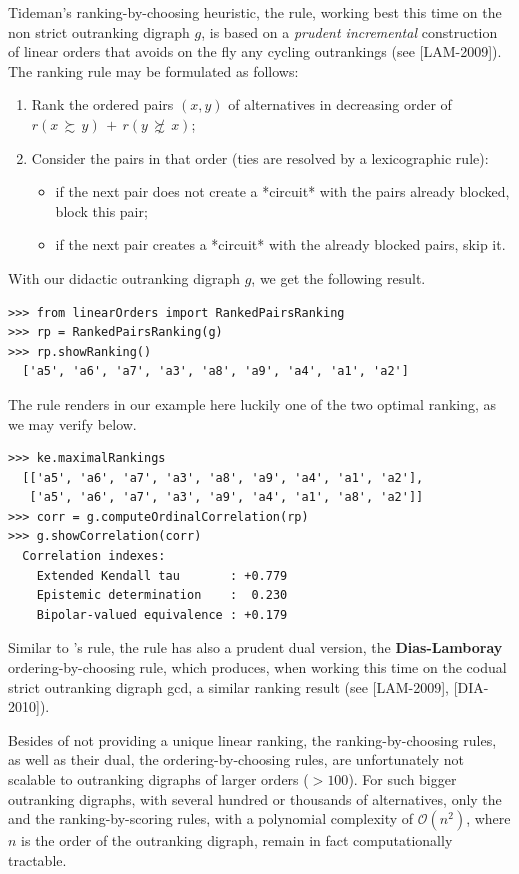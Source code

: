 Tideman's ranking-by-choosing heuristic, the \RankedPairs rule, working best this time on the non strict outranking digraph $g$, is based on a \emph{prudent incremental} construction of linear orders that avoids on the fly any cycling outrankings (see [LAM-2009]). The ranking rule may be formulated as follows:
\begin{enumerate}
 \item Rank the ordered pairs $(x,y)$ of alternatives in decreasing order of $r(x\, \succsim \,y) \,+\, r(y\, \not\succsim \,x)$;
 \item Consider the pairs in that order (ties are resolved by a lexicographic rule):
   \begin{itemize}
     \item if the next pair does not create a *circuit* with the pairs already blocked, block this pair;
     \item if the next pair creates a *circuit* with the already blocked pairs, skip it.
    \end{itemize}
\end{enumerate}
With our didactic outranking digraph $g$, we get the following result.

\begin{lstlisting}[caption={Computing a \RankedPairs ranking},label=list:8.15]   
>>> from linearOrders import RankedPairsRanking
>>> rp = RankedPairsRanking(g)
>>> rp.showRanking()
  ['a5', 'a6', 'a7', 'a3', 'a8', 'a9', 'a4', 'a1', 'a2']
\end{lstlisting}

The \RankedPairs rule renders in our example here luckily one of the two optimal \Kemeny ranking, as we may verify below.
 
\begin{lstlisting}
>>> ke.maximalRankings
  [['a5', 'a6', 'a7', 'a3', 'a8', 'a9', 'a4', 'a1', 'a2'],
   ['a5', 'a6', 'a7', 'a3', 'a9', 'a4', 'a1', 'a8', 'a2']]
>>> corr = g.computeOrdinalCorrelation(rp)
>>> g.showCorrelation(corr)
  Correlation indexes:
    Extended Kendall tau       : +0.779
    Epistemic determination    :  0.230
    Bipolar-valued equivalence : +0.179
\end{lstlisting}

Similar to \Kohler 's rule, the \RankedPairs rule has also a prudent dual version, the \textbf{Dias-Lamboray} ordering-by-choosing rule, which produces, when working this time on the codual strict outranking digraph gcd, a similar ranking result (see [LAM-2009], [DIA-2010]).

Besides of not providing a unique linear ranking, the ranking-by-choosing rules, as well as their dual, the ordering-by-choosing rules, are unfortunately not scalable to outranking digraphs of larger orders ($> 100$). For such bigger outranking digraphs, with several hundred or thousands of alternatives, only the \Copeland and the \NetFlows ranking-by-scoring rules, with a polynomial complexity of $\mathcal{O}(n^2)$, where $n$ is the order of the outranking digraph, remain in fact computationally tractable.
